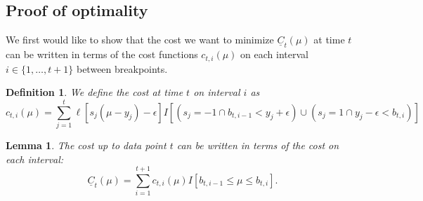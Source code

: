 \documentclass{article}
\newtheorem{lemma}{Lemma}
\newtheorem{definition}{Definition}
\begin{document}
\subsection{Proof of optimality}

We first would like to show that the cost we want to minimize
$\underline C_t(\mu)$ at time $t$ can be written in terms of the cost
functions $c_{t,i}(\mu)$ on each interval $i\in\{1,\dots, t+1\}$
between breakpoints.

\begin{definition}
  We define the cost at time $t$ on interval $i$ as
  \label{def:cti}
  \begin{equation*}
    c_{t,i}(\mu)=\sum_{j=1}^t
    \ell[s_j(\mu-y_j)-\epsilon]
    I[(s_j=-1\cap b_{t,i-1}<y_j+\epsilon)\cup(s_j=1\cap y_j-\epsilon<b_{t,i})]
  \end{equation*}
\end{definition}

\begin{lemma}
  \label{lemma:cost-intervals}
  The cost up to data point $t$ can be written in terms of the cost on each interval:
$$
\underline C_t(\mu) = \sum_{i=1}^{t+1}
c_{t,i}(\mu) I[b_{t,i-1}\leq \mu \leq b_{t,i}].
$$
\end{lemma}
\end{document}
